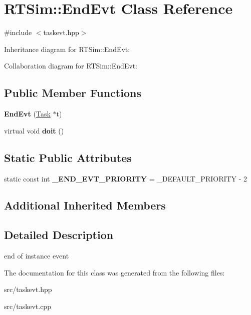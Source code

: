 \hypertarget{classRTSim_1_1EndEvt}{}\section{R\+T\+Sim\+:\+:End\+Evt Class Reference}
\label{classRTSim_1_1EndEvt}


{\ttfamily \#include $<$taskevt.\+hpp$>$}



Inheritance diagram for R\+T\+Sim\+:\+:End\+Evt\+:


Collaboration diagram for R\+T\+Sim\+:\+:End\+Evt\+:
\subsection*{Public Member Functions}
\begin{DoxyCompactItemize}
\item 
{\bfseries End\+Evt} (\hyperlink{classRTSim_1_1Task}{Task} $\ast$t)
\item 
virtual void {\bfseries doit} ()
\end{DoxyCompactItemize}
\subsection*{Static Public Attributes}
\begin{DoxyCompactItemize}
\item 
static const int {\bfseries \+\_\+\+E\+N\+D\+\_\+\+E\+V\+T\+\_\+\+P\+R\+I\+O\+R\+I\+TY} = \+\_\+\+D\+E\+F\+A\+U\+L\+T\+\_\+\+P\+R\+I\+O\+R\+I\+TY -\/ 2
\end{DoxyCompactItemize}
\subsection*{Additional Inherited Members}


\subsection{Detailed Description}
end of instance event 

The documentation for this class was generated from the following files\+:\begin{DoxyCompactItemize}
\item 
src/taskevt.\+hpp\item 
src/taskevt.\+cpp\end{DoxyCompactItemize}
